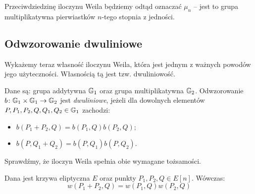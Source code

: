 \begin{remark}
Przeciwdziedzinę iloczynu Weila będziemy odtąd oznaczać $\mu_n$ --
jest to grupa multiplikatywna pierwiastków $n$-tego stopnia
z jedności.
\end{remark}

\subsection*{Odwzorowanie dwuliniowe}

Wykażemy teraz własność iloczynu Weila,
która jest jednym z ważnych powodów jego użyteczności.
Własnością tą jest tzw. dwuliniowość.

\begin{definition}
Dane są: grupa addytywna $\mathbb{G}_1$ oraz grupa multiplikatywna $\mathbb{G}_2$.
Odwzorowanie $b\colon \mathbb{G}_1 \times \mathbb{G}_1 \to \mathbb{G}_2$
jest \emph{dwuliniowe},
jeżeli dla dowolnych elementów $P, P_1, P_2, Q, Q_1, Q_2 \in \mathbb{G}_1$ zachodzi:
\begin{itemize}
\item $b(P_1 + P_2, Q) = b(P_1, Q)b(P_2, Q)$;
\item $b(P, Q_1 + Q_2) = b(P, Q_1)b(P, Q_2)$.
\end{itemize}
\end{definition}

Sprawdźmy, że iloczyn Weila spełnia obie wymagane tożsamości.

\begin{lemma}
Dana jest krzywa eliptyczna $E$ oraz punkty $P_1, P_2, Q \in E[n]$.
Wówczas:
\begin{equation}
w(P_1 + P_2, Q) = w(P_1, Q)w(P_2, Q)
\end{equation}
\end{lemma}

